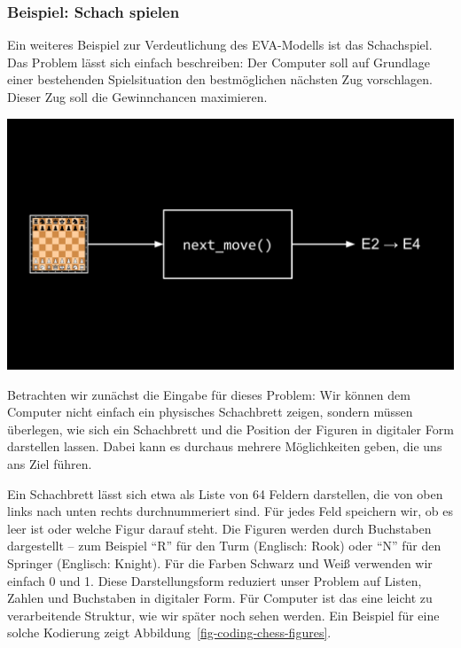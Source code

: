 \documentclass[
  ngerman,
  letterpaper,
  DIV=11]{scrreprt}
\begin{document}
\subsubsection{Beispiel: Schach spielen}\label{beispiel-schach-spielen}

Ein weiteres Beispiel zur Verdeutlichung des EVA-Modells ist das
Schachspiel. Das Problem lässt sich einfach beschreiben: Der Computer
soll auf Grundlage einer bestehenden Spielsituation den bestmöglichen
nächsten Zug vorschlagen. Dieser Zug soll die Gewinnchancen maximieren.

\begin{center}
\includegraphics[width=1\linewidth,height=\textheight,keepaspectratio]{problem-solving_files/mediabag/problem_solving_exam1234.png}
\end{center}

Betrachten wir zunächst die Eingabe für dieses Problem: Wir können dem
Computer nicht einfach ein physisches Schachbrett zeigen, sondern müssen
überlegen, wie sich ein Schachbrett und die Position der Figuren in
digitaler Form darstellen lassen. Dabei kann es durchaus mehrere
Möglichkeiten geben, die uns ans Ziel führen.

Ein Schachbrett lässt sich etwa als Liste von 64 Feldern darstellen, die
von oben links nach unten rechts durchnummeriert sind. Für jedes Feld
speichern wir, ob es leer ist oder welche Figur darauf steht. Die
Figuren werden durch Buchstaben dargestellt -- zum Beispiel ``R'' für
den Turm (Englisch: Rook) oder ``N'' für den Springer (Englisch:
Knight). Für die Farben Schwarz und Weiß verwenden wir einfach 0 und 1.
Diese Darstellungsform reduziert unser Problem auf Listen, Zahlen und
Buchstaben in digitaler Form. Für Computer ist das eine leicht zu
verarbeitende Struktur, wie wir später noch sehen werden. Ein Beispiel
für eine solche Kodierung zeigt
Abbildung~\ref{fig-coding-chess-figures}.
\end{document}
